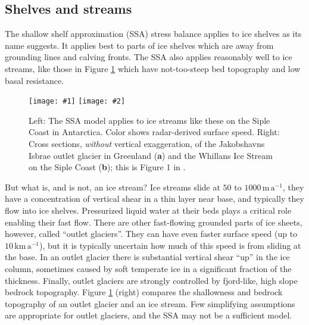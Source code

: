 \documentclass[letterpaper,final,12pt,reqno]{amsart}
\newcommand{\twofigsizes}[5]{
\begin{figure}[ht]
\centering
\texttt{[image: \#1]} \quad
\texttt{[image: \#2]}
\caption{#3}
\label{fig:#1}
\end{figure}}
\begin{document}
\subsection{Shelves and streams} \label{sec:shelvesandstreams}

The shallow shelf approximation (SSA) stress balance applies to ice shelves as its name suggests.  It applies best to parts of ice shelves which are away from grounding lines and calving fronts.  The SSA also applies reasonably well to ice streams, like those in Figure \ref{fig:siple} which have not-too-steep bed topography and low basal resistance.

\twofigsizes{siple}{streamisbrae}{Left:  The SSA model applies to ice streams like these on the Siple Coast in Antarctica.  Color shows radar-derived surface speed.  Right: Cross sections, \emph{without} vertical exaggeration, of the Jakobshavns Isbrae outlet glacier in Greenland (\textbf{a}) and the Whillans Ice Stream on the Siple Coast (\textbf{b}); this is Figure 1 in \cite{TrufferEchelmeyer}.}{2.8in}{2.9in}

But what is, and is not, an ice stream?  Ice streams slide at $50$ to $1000 \,\text{m}\,\text{a}^{-1}$, they have a concentration of vertical shear in a thin layer near base, and typically they flow into ice shelves.  Pressurized liquid water at their beds plays a critical role enabling their fast flow.  There are other fast-flowing grounded parts of ice sheets, however, called ``outlet glaciers''.  They can have even faster surface speed (up to $10 \,\text{km}\,\text{a}^{-1}$), but it is typically uncertain how much of this speed is from sliding at the base.  In an outlet glacier there is substantial vertical shear ``up'' in the ice column, sometimes caused by soft temperate ice in a significant fraction of the thickness.  Finally, outlet glaciers are strongly controlled by fjord-like, high slope bedrock topography.  Figure \ref{fig:siple} (right) compares the shallowness and bedrock topography of an outlet glacier and an ice stream.  Few simplifying assumptions are appropriate for outlet glaciers, and the SSA may not be a sufficient model.
\end{document}
